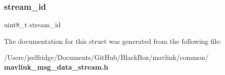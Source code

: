 \mbox{\label{struct____mavlink__data__stream__t_a2fd8236994d7864391c66dfd28c405f9}} 
\subsubsection{stream\+\_\+id}
{\footnotesize\ttfamily uint8\+\_\+t stream\+\_\+id}



The documentation for this struct was generated from the following file\+:\begin{DoxyCompactItemize}
\item 
/\+Users/jselfridge/\+Documents/\+Git\+Hub/\+Black\+Box/mavlink/common/\textbf{ mavlink\+\_\+msg\+\_\+data\+\_\+stream.\+h}\end{DoxyCompactItemize}
